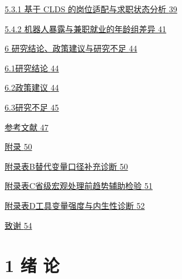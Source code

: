 \hyperref[ux57faux4e8e-clds-ux7684ux5c97ux4f4dux9002ux914dux4e0eux6c42ux804cux72b6ux6001ux5206ux6790]{5.3.1 基于 CLDS 的岗位适配与求职状态分析 \hyperref[ux57faux4e8e-clds-ux7684ux5c97ux4f4dux9002ux914dux4e0eux6c42ux804cux72b6ux6001ux5206ux6790]{39}}

\hyperref[ux673aux5668ux4ebaux66b4ux9732ux4e0eux517cux804cux5c31ux4e1aux7684ux5e74ux9f84ux7ec4ux5deeux5f02]{5.4.2 机器人暴露与兼职就业的年龄组差异 \hyperref[ux673aux5668ux4ebaux66b4ux9732ux4e0eux517cux804cux5c31ux4e1aux7684ux5e74ux9f84ux7ec4ux5deeux5f02]{41}}

\hyperref[ux7814ux7a76ux7ed3ux8bbaux653fux7b56ux5efaux8baeux4e0eux7814ux7a76ux4e0dux8db3]{6 研究结论、政策建议与研究不足 \hyperref[ux7814ux7a76ux7ed3ux8bbaux653fux7b56ux5efaux8baeux4e0eux7814ux7a76ux4e0dux8db3]{44}}

\hyperref[ux7814ux7a76ux7ed3ux8bba]{6.1研究结论 \hyperref[ux7814ux7a76ux7ed3ux8bba]{44}}

\hyperref[ux653fux7b56ux5efaux8bae]{6.2政策建议 \hyperref[ux653fux7b56ux5efaux8bae]{44}}

\hyperref[ux7814ux7a76ux4e0dux8db3]{6.3研究不足 \hyperref[ux7814ux7a76ux4e0dux8db3]{45}}

\hyperref[ux53c2ux8003ux6587ux732e]{参考文献 \hyperref[ux53c2ux8003ux6587ux732e]{47}}

\hyperref[ux9644ux5f55]{附录 \hyperref[ux9644ux5f55]{50}}

\hyperref[ux9644ux5f55ux8868bux66ffux4ee3ux53d8ux91cfux53e3ux5f84ux8865ux5145ux8bcaux65ad]{附录表B替代变量口径补充诊断 \hyperref[ux9644ux5f55ux8868bux66ffux4ee3ux53d8ux91cfux53e3ux5f84ux8865ux5145ux8bcaux65ad]{50}}

\hyperref[ux9644ux5f55ux8868cux7701ux7ea7ux5b8fux89c2ux5904ux7406ux524dux8d8bux52bfux8f85ux52a9ux68c0ux9a8c]{附录表C省级宏观处理前趋势辅助检验 \hyperref[ux9644ux5f55ux8868cux7701ux7ea7ux5b8fux89c2ux5904ux7406ux524dux8d8bux52bfux8f85ux52a9ux68c0ux9a8c]{51}}

\hyperref[ux9644ux5f55ux8868dux5de5ux5177ux53d8ux91cfux5f3aux5ea6ux4e0eux5185ux751fux6027ux8bcaux65ad]{附录表D工具变量强度与内生性诊断 \hyperref[ux9644ux5f55ux8868dux5de5ux5177ux53d8ux91cfux5f3aux5ea6ux4e0eux5185ux751fux6027ux8bcaux65ad]{52}}

\hyperref[ux81f4ux8c22]{致谢 \hyperref[ux81f4ux8c22]{54}}

\section{1 绪 论}\label{ux7eea-ux8bba}

